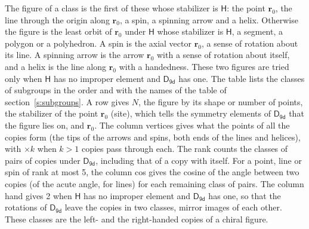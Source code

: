 \documentclass[10pt,a4paper]{article}
\numberwithin{equation}{section}
\newcommand{\grp}[1]{\mathsf{#1}}
\newcommand{\pointr}{\mathbf{r}}
\begin{document}
\leavevmode\label{n:head.figure}The figure of a class is the first of these whose stabilizer is $\grp{H}$: the point $\pointr_0$, the line through the origin along $\pointr_0$, a spin, a spinning arrow and a helix. Otherwise the figure is the least orbit of $\pointr_0$ under $\grp{H}$ whose stabilizer is $\grp{H}$, a segment, a polygon or a polyhedron. A spin is the axial vector $\pointr_0$, a sense of rotation about its line. A spinning arrow is the arrow $\pointr_0$ with a sense of rotation about itself, and a helix is the line along $\pointr_0$ with a handedness. These two figures are tried only when $\grp{H}$ has no improper element and $\grp{D_{9d}}$ has one. The table lists the classes of subgroups in the order and with the names of the table of section~\ref{s:subgroups}. \label{n:head.site}A row gives $N$, the figure by its shape or number of points, the stabilizer of the point $\pointr_0$ (site), which tells the symmetry elements of $\grp{D_{9d}}$ that the figure lies on, and $\pointr_0$. \label{n:head.vertices}The column vertices gives what the points of all the copies form (the tips of the arrows and spins, both ends of the lines and helices), with ${\times}k$ when $k > 1$ copies pass through each. \label{n:head.rank}The rank counts the classes of pairs of copies under $\grp{D_{9d}}$, including that of a copy with itself. \label{n:head.cos}For a point, line or spin of rank at most 5, the column cos gives the cosine of the angle between two copies (of the acute angle, for lines) for each remaining class of pairs. \label{n:head.hand}The column hand gives 2 when $\grp{H}$ has no improper element and $\grp{D_{9d}}$ has one, so that the rotations of $\grp{D_{9d}}$ leave the copies in two classes, mirror images of each other. These classes are the left- and the right-handed copies of a chiral figure.
\end{document}
